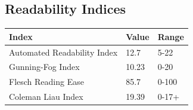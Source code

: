 \documentclass[12pt]{article}
\begin{document}
\subsection{Readability Indices}
\begin{table}[H]

\begin{center}
\begin{tabular}{|l|l|l|}
\hline
\textbf{Index}              & \textbf{Value} & \textbf{Range} \\ \hline
Automated Readability Index & 12.7            & 5-22           \\ \hline
Gunning-Fog Index           & 10.23           & 0-20           \\ \hline
Flesch Reading Ease         & 85.7           & 0-100          \\ \hline
Coleman Liau Index          & 19.39          & 0-17+          \\ \hline
\end{tabular}
\end{center}
\end{table}
\end{document}
